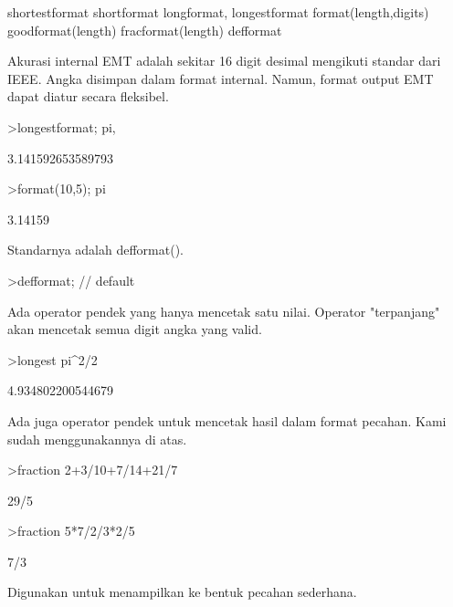 \documentclass[a4paper,10pt]{article}
\begin{document}
\begin{eulernotebook}
\begin{eulercomment}
\begin{eulercomment}
\begin{eulercomment}
\end{eulercomment}
\begin{eulerttcomment}
 shortestformat shortformat longformat, longestformat
 format(length,digits) goodformat(length)
 fracformat(length)
 defformat
\end{eulerttcomment}
\begin{eulercomment}

Akurasi internal EMT adalah sekitar 16 digit desimal mengikuti standar
dari IEEE. Angka disimpan dalam format internal. Namun, format output
EMT dapat diatur secara fleksibel.

\end{eulercomment}
\begin{eulerprompt}
>longestformat; pi,
\end{eulerprompt}
\begin{euleroutput}
  3.141592653589793
\end{euleroutput}
\begin{eulerprompt}
>format(10,5); pi
\end{eulerprompt}
\begin{euleroutput}
    3.14159 
\end{euleroutput}
\begin{eulercomment}
Standarnya adalah defformat().
\end{eulercomment}
\begin{eulerprompt}
>defformat; // default
\end{eulerprompt}
\begin{eulercomment}
Ada operator pendek yang hanya mencetak satu nilai. Operator
"terpanjang" akan mencetak semua digit angka yang valid.
\end{eulercomment}
\begin{eulerprompt}
>longest pi^2/2
\end{eulerprompt}
\begin{euleroutput}
        4.934802200544679 
\end{euleroutput}
\begin{eulercomment}
Ada juga operator pendek untuk mencetak hasil dalam format pecahan.
Kami sudah menggunakannya di atas.
\end{eulercomment}
\begin{eulerprompt}
>fraction 2+3/10+7/14+21/7
\end{eulerprompt}
\begin{euleroutput}
  29/5
\end{euleroutput}
\begin{eulerprompt}
>fraction 5*7/2/3*2/5
\end{eulerprompt}
\begin{euleroutput}
  7/3
\end{euleroutput}
\begin{eulercomment}
Digunakan untuk menampilkan ke bentuk pecahan sederhana.


\end{eulercomment}
\end{eulercomment}
\end{eulercomment}
\end{eulernotebook}
\end{document}
